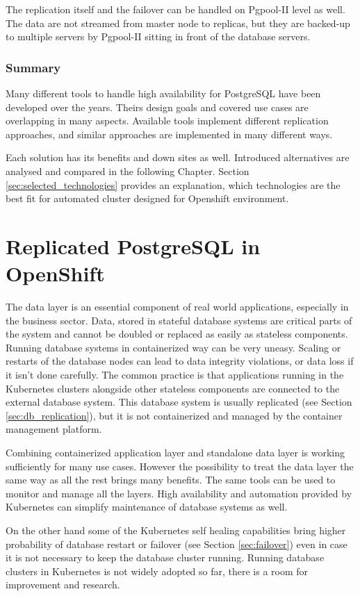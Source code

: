 \documentclass[
  digital, %
  twoside, %
  table,   %
  lof,     %
  lot,     %
]{fithesis3}
\begin{document}
The replication itself and the failover can be handled on Pgpool-II level as well. The data are not streamed from master node to replicas, but they are backed-up to multiple servers by Pgpool-II sitting in front of the database servers.

\subsection{Summary}
Many different tools to handle high availability for PostgreSQL have been developed over the years. Theirs design goals and covered use cases are overlapping in many aspects. Available tools implement different replication approaches, and similar approaches are implemented in many different ways.

Each solution has its benefits and down sites as well. Introduced alternatives are analysed and compared in the following Chapter. Section \ref{sec:selected_technologies} provides an explanation, which technologies are the best fit for automated cluster designed for Openshift environment.

\chapter{Replicated PostgreSQL in OpenShift} \label{chap:pg_in_openshift}
The data layer is an essential component of real world applications, especially in the business sector. Data, stored in stateful database systems are critical parts of the system and cannot be doubled or replaced as easily as stateless components. Running database systems in containerized way can be very uneasy. Scaling or restarts of the database nodes can lead to data integrity violations, or data loss if it isn't done carefully. The common practice is that applications running in the Kubernetes clusters alongside other stateless components are connected to the external database system. This database system is usually replicated (see Section \ref{sec:db_replication}), but it is not containerized and managed by the container management platform.

Combining containerized application layer and standalone data layer is working sufficiently for many use cases. However the possibility to treat the data layer the same way as all the rest brings many benefits. The same tools can be used to monitor and manage all the layers. High availability and automation provided by Kubernetes can simplify maintenance of database systems as well.

On the other hand some of the Kubernetes self healing capabilities bring higher probability of database restart or failover (see Section \ref{sec:failover}) even in case it is not necessary to keep the database cluster running. Running database clusters in Kubernetes is not widely adopted so far, there is a room for improvement and research.
\end{document}
